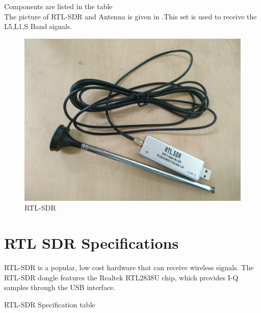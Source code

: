 Components are listed in the table \\
The picture of RTL-SDR and Antenna is given in .This set is used to receive the L5,L1,S Band  signals.
\begin{figure}[ht]
\centering
\includegraphics[width=0.5\columnwidth]{figs/rtl-sdr.png}
\caption{RTL-SDR}
\label{fig:rtl-sdr}
\end{figure}
\section{RTL SDR Specifications}
RTL-SDR is a popular, low cost hardware that can receive wireless signals. The RTL-SDR dongle features the Realtek RTL2838U chip, which provides I-Q samples through the USB interface. 
\begin{table}[!ht]
  \centering
 
  \caption{RTL-SDR Specification table }
  \label{tab:rxspecification}
\end{table}

